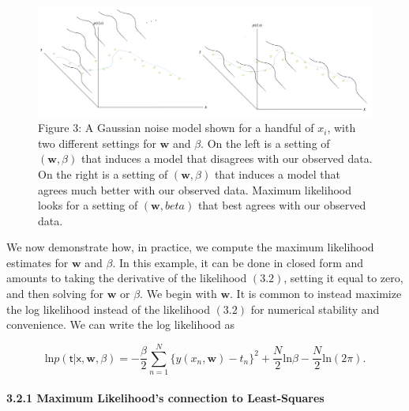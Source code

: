 \documentclass[
  0.875em,
  letterpaper,
  DIV=11,
  numbers=noendperiod]{scrartcl}
\let\oldparagraph\paragraph
\renewcommand{\paragraph}[1]{\oldparagraph{#1}\mbox{}}
\begin{document}
\begin{figure}

{\centering \includegraphics[width=5.20833in,height=\textheight]{./img/gaussian_noise_model_disagreement.png}

}

\caption{Figure 3: A Gaussian noise model shown for a handful of
\(x_i\), with two different settings for \(\mathbf{w}\) and \(\beta\).
On the left is a setting of \((\mathbf{w}, \beta)\) that induces a model
that disagrees with our observed data. On the right is a setting of
\((\mathbf{w}, \beta)\) that induces a model that agrees much better
with our observed data. Maximum likelihood looks for a setting of
\((\mathbf{w}, beta)\) that best agrees with our observed data.}

\end{figure}

We now demonstrate how, in practice, we compute the maximum likelihood
estimates for \(\mathbf{w}\) and \(\beta\). In this example, it can be
done in closed form and amounts to taking the derivative of the
likelihood \((3.2)\), setting it equal to zero, and then solving for
\(\mathbf{w}\) or \(\beta\). We begin with \(\mathbf{w}\). It is common
to instead maximize the log likelihood instead of the likelihood
\((3.2)\) for numerical stability and convenience. We can write the log
likelihood as

\[
\text{ln}p(\pmb{\mathsf{t}}| \pmb{\mathsf{x}}, \mathbf{w}, \beta) = - \frac{\beta}{2} \sum_{n=1}^N \{y(x_n ,\mathbf{w}) - t_n \}^2 + \frac{N}{2} \text{ln}\beta - \frac{N}{2} \text{ln}(2 \pi). \tag{3.3}
\]

\hypertarget{maximum-likelihoods-connection-to-least-squares}{%
\paragraph{\texorpdfstring{\textbf{3.2.1 Maximum Likelihood's connection
to
Least-Squares}}{3.2.1 Maximum Likelihood's connection to Least-Squares}}\label{maximum-likelihoods-connection-to-least-squares}}
\end{document}
